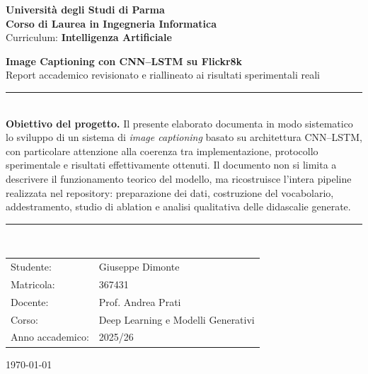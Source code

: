 \documentclass[11pt,a4paper]{report}
\begin{document}
\begin{titlepage}
  \centering

  {\Large \textbf{Università degli Studi di Parma} \\[0.3em]
  \textbf{Corso di Laurea in Ingegneria Informatica} \\[0.3em]
  Curriculum: \textbf{Intelligenza Artificiale} \\[2em]}

  {\Huge \textbf{Image Captioning con CNN--LSTM su Flickr8k}}\\[0.8em]
  {\Large Report accademico revisionato e riallineato ai risultati sperimentali reali}\\[1.5em]

  \rule{\linewidth}{0.4pt}\\[0.8em]
  \textbf{Obiettivo del progetto.}
  Il presente elaborato documenta in modo sistematico lo sviluppo di un sistema di \emph{image captioning} basato su architettura CNN--LSTM, con particolare attenzione alla coerenza tra implementazione, protocollo sperimentale e risultati effettivamente ottenuti. Il documento non si limita a descrivere il funzionamento teorico del modello, ma ricostruisce l'intera pipeline realizzata nel repository: preparazione dei dati, costruzione del vocabolario, addestramento, studio di ablation e analisi qualitativa delle didascalie generate.\\[0.8em]
  \rule{\linewidth}{0.4pt}\\[3em]

  \begin{tabular}{ll}
  Studente: & Giuseppe Dimonte \\
  Matricola: & 367431 \\
  Docente: & Prof. Andrea Prati \\
  Corso: & Deep Learning e Modelli Generativi \\
  Anno accademico: & 2025/26 \\
  \end{tabular}

  \vfill
  {\large \today}
\end{titlepage}

\tableofcontents
\clearpage
\end{document}
